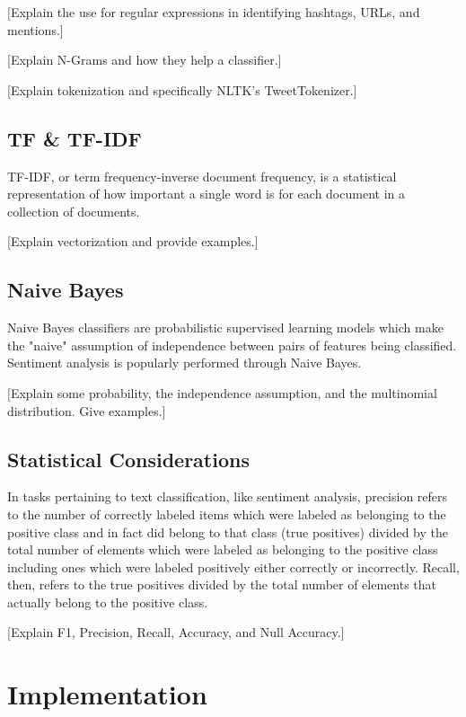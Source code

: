 \documentclass[11pt, twoside, reqno]{book}
\begin{document}
[Explain the use for regular expressions in identifying hashtags, URLs, and mentions.]

[Explain N-Grams and how they help a classifier.]

[Explain tokenization and specifically NLTK's TweetTokenizer.]

\section{TF \& TF-IDF}
\label{tf_tf_idf}

TF-IDF, or term frequency-inverse document frequency, is a statistical representation of how important a single word is for each document in a collection of documents.

[Explain vectorization and provide examples.]

\section{Naive Bayes}
\label{naive_bayes}

Naive Bayes classifiers are probabilistic supervised learning models which make the "naive" assumption of independence between pairs of features being classified. Sentiment analysis is popularly performed through Naive Bayes.

[Explain some probability, the independence assumption, and the multinomial distribution. Give examples.]

\section{Statistical Considerations}
\label{statistical_considerations}

In tasks pertaining to text classification, like sentiment analysis, precision refers to the number of correctly labeled items which were labeled as belonging to the positive class and in fact did belong to that class (true positives) divided by the total number of elements which were labeled as belonging to the positive class including ones which were labeled positively either correctly or incorrectly. Recall, then, refers to the true positives divided by the total number of elements that actually belong to the positive class.

[Explain F1, Precision, Recall, Accuracy, and Null Accuracy.]

\chapter{Implementation}
\label{implementation}
\end{document}
